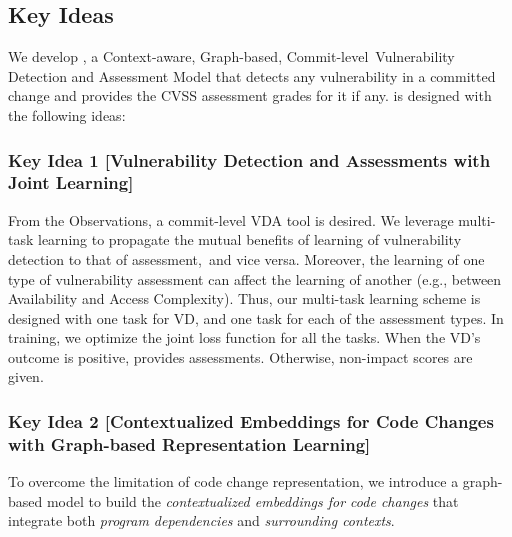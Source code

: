 \subsection{Key Ideas}
\label{key-ideas:sec}

We develop {\tool}, a Context-aware, Graph-based,
Commit-level~Vulnerability Detection and Assessment Model that detects
any vulnerability in a committed change and provides the CVSS
assessment grades for it if any.  {\tool} is designed with the
following ideas:


\subsubsection{{\bf Key Idea 1} [Vulnerability Detection and
    Assessments with Joint Learning]}

From the Observations, a commit-level VDA tool is desired. We leverage
multi-task learning to propagate the mutual benefits of learning of
vulnerability detection to that of assessment,~and vice
versa. Moreover, the learning of one type of vulnerability assessment
can affect the learning of another (e.g., between Availability and
Access Complexity). Thus, our multi-task learning scheme is designed
with one task for VD, and one task for each of the assessment
types. In training, we optimize the joint loss function for all the
tasks. When the VD's outcome is positive, {\tool} provides
assessments. Otherwise, non-impact scores are given.



\subsubsection{{\bf Key Idea 2} [Contextualized Embeddings for
    Code Changes with Graph-based Representation Learning]}
To overcome the limitation of code change representation, we introduce
a graph-based model to build the {\em contextualized embeddings for
  code changes} that integrate both {\em program dependencies} and
{\em surrounding contexts}.


